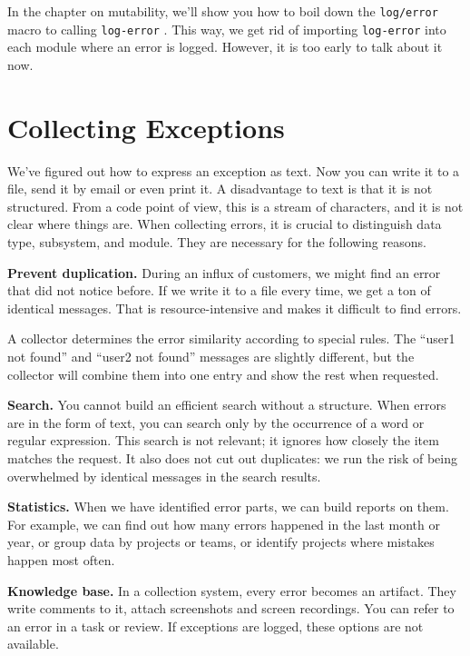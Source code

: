 In the chapter on mutability, we'll show you how to boil down the \verb|log/error| macro to calling \verb|log-error| . This way, we get rid of importing \verb|log-error| into each module where an error is logged. However, it is too early to talk about it now.

\section{Collecting Exceptions}


We've figured out how to express an exception as text. Now you can write it to a file, send it by email or even print it. A disadvantage to text is that it is not structured. From a code point of view, this is a stream of characters, and it is not clear where things are. When collecting errors, it is crucial to distinguish data type, subsystem, and module. They are necessary for the following reasons.

\textbf{Prevent duplication.} During an influx of customers, we might find an error that did not notice before. If we write it to a file every time, we get a ton of identical messages. That is resource-intensive and makes it difficult to find errors.

A collector determines the error similarity according to special rules. The ``user1 not found'' and ``user2 not found'' messages are slightly different, but the collector will combine them into one entry and show the rest when requested.

\textbf{Search.} You cannot build an efficient search without a structure.
When errors are in the form of text, you can search only by the occurrence of a word or regular expression. This search is not relevant; it ignores how closely the item matches the request. It also does not cut out duplicates: we run the risk of being overwhelmed by identical messages in the search results.

\textbf{Statistics.} When we have identified error parts, we can build reports on them. For example, we can find out how many errors happened in the last month or year, or group data by projects or teams, or identify projects where mistakes happen most often.

\textbf{Knowledge base.} In a collection system, every error becomes an artifact. They write comments to it, attach screenshots and screen recordings. You can refer to an error in a task or review. If exceptions are logged, these options are not available.

